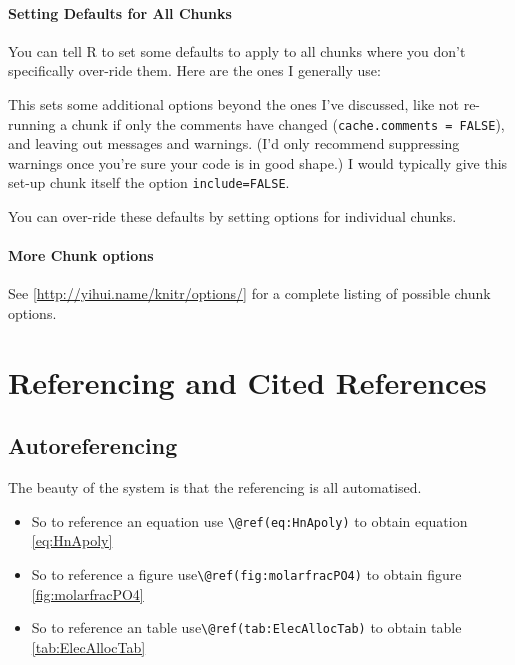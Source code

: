 \documentclass[]{book}
\providecommand{\tightlist}{%
  \setlength{\itemsep}{0pt}\setlength{\parskip}{0pt}}
\theoremstyle{definition}
\theoremstyle{definition}
\theoremstyle{definition}
\theoremstyle{remark}
\begin{document}
\subsubsection{Setting Defaults for All
Chunks}\label{setting-defaults-for-all-chunks}

You can tell R to set some defaults to apply to all chunks where you
don't specifically over-ride them. Here are the ones I generally use:

This sets some additional options beyond the ones I've discussed, like
not re-running a chunk if only the comments have changed
(\texttt{cache.comments\ =\ FALSE}), and leaving out messages and
warnings. (I'd only recommend suppressing warnings once you're sure your
code is in good shape.) I would typically give this set-up chunk itself
the option \texttt{include=FALSE}.

You can over-ride these defaults by setting options for individual
chunks.

\subsubsection{More Chunk options}\label{more-chunk-options}

See {[}\url{http://yihui.name/knitr/options/}{]} for a complete listing
of possible chunk options.

\chapter{Referencing and Cited
References}\label{referencing-and-cited-references}

\section{Autoreferencing}\label{autoreferencing}

The beauty of the system is that the referencing is all automatised.

\begin{itemize}
\tightlist
\item
  So to reference an equation use
  \texttt{\textbackslash{}@ref(eq:HnApoly)} to obtain equation
  \eqref{eq:HnApoly}
\item
  So to reference a figure
  use\texttt{\textbackslash{}@ref(fig:molarfracPO4)} to obtain figure
  \ref{fig:molarfracPO4}
\item
  So to reference an table
  use\texttt{\textbackslash{}@ref(tab:ElecAllocTab)} to obtain table
  \ref{tab:ElecAllocTab}
\end{itemize}
\end{document}
